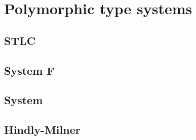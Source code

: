 \chapter{Polymorphic type systems}\label{ch:poly}

\section{STLC}

\section{System \textsf{F}}

\section{System \Fw}

\section{Hindly-Milner}

